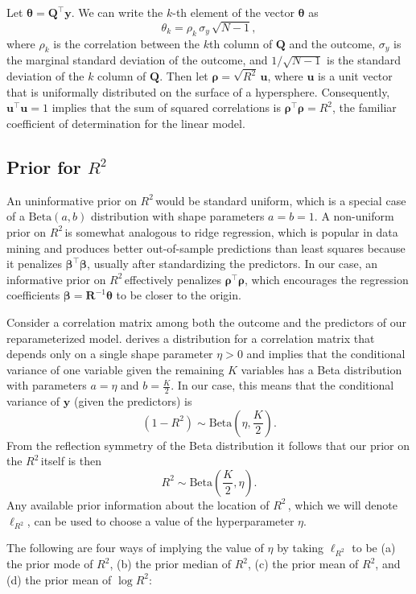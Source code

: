 \documentclass[11pt]{article}
\newcommand{\Rsq}{$R^2\,$}
\newcommand{\boldrho}{\boldsymbol{\rho}}
\newcommand{\boldbeta}{\boldsymbol{\beta}}
\newcommand{\boldtheta}{\boldsymbol{\theta}}
\newcommand{\y}{\mathbf{y}}
\newcommand{\Q}{\mathbf{Q}}
\newcommand{\R}{\mathbf{R}}
\renewcommand{\u}{\mathbf{u}}
\newcommand{\locRsq}{\ell_{R^2}}
\newcommand{\halfK}{\frac{K}{2}}
\newcommand{\Betadist}[2]{\mathrm{Beta}\left(#1,#2\right)}
\begin{document}
Let $\boldtheta = \Q^\top \y$. We can write the $k$-th element of the vector
$\boldtheta$ as
$$\theta_k = \rho_k \, \sigma_y \, \sqrt{N - 1},$$
where $\rho_k$ is the correlation between the $k$th column of $\Q$ and the
outcome, $\sigma_y$ is the marginal standard deviation of the outcome, and
$1/\sqrt{N-1}$ is the standard deviation of the $k$ column of $\Q$. Then let
$\boldrho = \sqrt{R^2} \, \u$, where $\u$ is a unit vector that is
uniformally distributed on the surface of a hypersphere. Consequently,
$\u^\top \u = 1$ implies that the sum of squared correlations is
$\boldrho^\top \boldrho = R^2$, the familiar coefficient of determination for
the linear model.

\subsection{Prior for \Rsq}
\label{subsec:r2prior}
An uninformative prior on \Rsq would be standard uniform, which is a special
case of a $\Betadist{a}{b}$ distribution with shape parameters $a = b = 1$.
A non-uniform prior on \Rsq is somewhat analogous to ridge
regression, which is popular in data mining and produces better out-of-sample
predictions than least squares because it penalizes $\boldbeta^\top \boldbeta$,
usually after standardizing the predictors. In our case, an informative prior on
\Rsq effectively penalizes $\boldrho^\top \boldrho$, which encourages the
regression coefficients $\boldbeta = \R^{-1} \boldtheta$ to be closer to the
origin.

Consider a correlation matrix among both the outcome and the predictors of our
reparameterized model.  derives a distribution for a correlation
matrix that depends only on a single shape parameter $\eta > 0$ and implies that
the conditional variance of one variable given the remaining $K$ variables has a
Beta distribution with parameters $a = \eta$ and $b = \halfK$. In our case, this
means that the conditional variance of $\y$ (given the predictors) is
$$(1 - R^2) \sim \Betadist{\eta}{\halfK}.$$
From the reflection symmetry of the Beta distribution it follows that our prior
on the \Rsq itself is then
$$R^2 \sim \Betadist{\halfK}{\eta}.$$
Any available prior information about the location of \Rsq, which we will denote
$\locRsq$, can be used to choose a value of the hyperparameter $\eta$.

The following are four ways of implying the value of $\eta$ by taking
$\locRsq$ to be (a) the prior mode of $R^2$, (b) the prior median of $R^2$,
(c) the prior mean of $R^2$, and (d) the prior mean of $\log{R^2}$:
\end{document}
